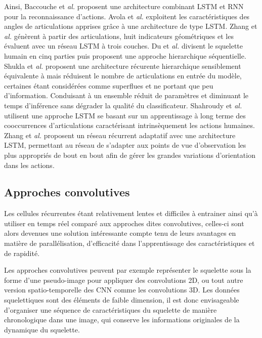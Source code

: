 Ainsi, Baccouche et\textit{ al.}\cite{baccouche2011sequential} proposent une architecture combinant LSTM et RNN pour la reconnaissance d'actions.
Avola et\textit{ al.} \cite{avola2018exploiting} exploitent les caractéristiques des angles de articulations apprises grâce à une architecture de type LSTM. 
Zhang et\textit{ al.}\cite{zhang2017geometric} génèrent à partir des articulations, huit indicateurs géométriques et les évaluent avec un réseau LSTM à trois couches.
Du et\textit{ al.}\cite{du2015hierarchical} divisent le squelette humain en cinq parties puis proposent une approche hierarchique séquentielle.
Shukla et\textit{ al.}\cite{shukla2017recurrent} proposent une architecture récurente hierarchique sensiblement équivalente à \cite{du2015hierarchical} mais réduisent le nombre de articulations en entrée du modèle, certaines étant considérées comme superflues et ne portant que peu d'information. Conduisant à un ensemble réduit de paramètres et diminuant le temps d'inférence sans dégrader la qualité du classificateur.
Shahroudy et\textit{ al.}\cite{shahroudy2016ntu} utilisent une approche LSTM se basant sur un apprentissage à long terme des cooccurrences d'articulations caractérisant intrinsèquement les actions humaines.
Zhang et\textit{ al.}\cite{zhang2017view} proposent un réseau récurrent adaptatif avec une architecture LSTM, permettant au réseau de s'adapter aux points de vue d'observation les plus appropriés de bout en bout afin de gérer les grandes variations d'orientation dans les actions.

 

\subsection{Approches convolutives}
Les cellules récurrentes étant relativement lentes et difficiles à entrainer ainsi qu'à utiliser en temps réel comparé aux approches dites convolutives, celles-ci sont alors devenues une solution intéressante compte tenu de leurs avantages en matière de parallélisation, d'efficacité dans l'apprentissage des caractéristiques et de rapidité.


Les approches convolutives peuvent par exemple représenter le squelette sous la forme d'une pseudo-image pour appliquer des convolutions 2D, ou tout autre version spatio-temporelle des CNN comme les convolutions 3D. Les données squelettiques sont des éléments de faible dimension, il est donc envisageable d'organiser une séquence de caractéristiques du squelette de manière chronologique dans une image, qui conserve les informations originales de la dynamique du squelette.

